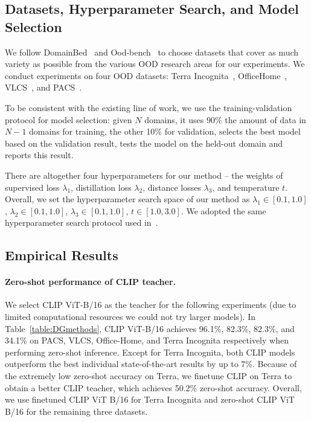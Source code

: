 \documentclass[10pt,twocolumn,letterpaper]{article}
\begin{document}
\subsection{Datasets, Hyperparameter Search, and Model
Selection}

We follow DomainBed~\cite{gulrajani2020search} and Ood-bench~\cite{ye2021ood} to choose datasets that cover as much variety as possible from the various OOD research areas for our experiments. We conduct experiments on four OOD datasets:  Terra Incognita~\cite{beery2018terra}, OfficeHome~\cite{venkateswara2017officehome}, VLCS~\cite{torralba2011vlcs}, and PACS~\cite{li2017pacs}.

To be consistent with the existing line of work, we use the training-validation protocol for model selection: given $N$ domains, it uses 90\% the amount of data in $N-1$ domains for training, the other 10\% for validation, selects the best model based on the validation result, tests the model on the held-out domain and reports this result. 

There are altogether four hyperparameters for our method -- the weights of supervised loss $\lambda_1$, distillation loss $\lambda_2$, distance losses $\lambda_3$, and temperature $t$. Overall, we set the hyperparameter search space of our method as $\lambda_1 \in [0.1, 1.0]$, $ \lambda_2 \in [0.1, 1.0]$, $\lambda_3 \in [0.1, 1.0]$, $t \in [1.0, 3.0]$.
We adopted the same hyperparameter search protocol used in~\cite{gulrajani2020search,ye2022ood}.

\subsection{Empirical Results}

\paragraph{Zero-shot performance of CLIP teacher.}
We select CLIP ViT-B/16 as the teacher for the following experiments (due to limited computational resources we could not try larger models). In Table~\ref{table:DGmethods}, CLIP ViT-B/16 achieves 96.1\%, 82.3\%, 82.3\%, and 34.1\% on PACS, VLCS, Office-Home, and Terra Incognita respectively when performing zero-shot inference. Except for Terra Incognita, both CLIP models outperform the best individual state-of-the-art results by up to 7\%. 
Because of the extremely low zero-shot accuracy on Terra, we finetune CLIP on Terra to obtain a better CLIP teacher, which achieves 50.2\% zero-shot accuracy.
Overall, we use finetuned CLIP ViT B/16 for Terra Incognita and zero-shot CLIP ViT B/16 for the remaining three datasets.
\end{document}
